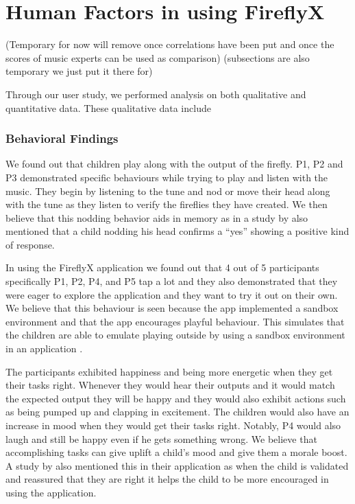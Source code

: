 \chapter{Human Factors in using FireflyX}

(Temporary for now will remove once correlations have been put and once the scores of music experts can be used as comparison)
(subsections are also temporary we just put it there for)

Through our user study, we performed analysis on both qualitative and quantitative data. These qualitative data include 

\subsection{Behavioral Findings}

We found out that children play along with the output of the firefly. P1, P2 and P3 demonstrated specific behaviours while trying to play and listen with the music. They begin by listening to the tune and nod or move their head along with the tune as they listen to verify the fireflies they have created. We then believe that this nodding behavior aids in memory as in a study by  also mentioned that a child nodding his head confirms a “yes” showing a positive kind of response.

In using the FireflyX application we found out that 4 out of 5 participants specifically P1, P2, P4, and P5 tap a lot and they also demonstrated that they were eager to explore the application and they want to try it out on their own. We believe that this behaviour is seen because the app implemented a sandbox environment and that the app encourages playful behaviour. This simulates that the children are able to emulate playing outside by using a sandbox environment in an application \cite{inal2007flow}. 

The participants exhibited happiness and being more energetic when they get their tasks right. Whenever they would hear their outputs and it would match the expected output they will be happy and they would also exhibit actions such as being pumped up and clapping in excitement. The children would also have an increase in mood when they would get their tasks right. Notably, P4 would also laugh and still be happy even if he gets something wrong. We believe that accomplishing tasks can give uplift a child's mood and give them a morale boost. A study by  also mentioned this in their application as when the child is validated and reassured that they are right it helps the child to be more encouraged in using the application. 

